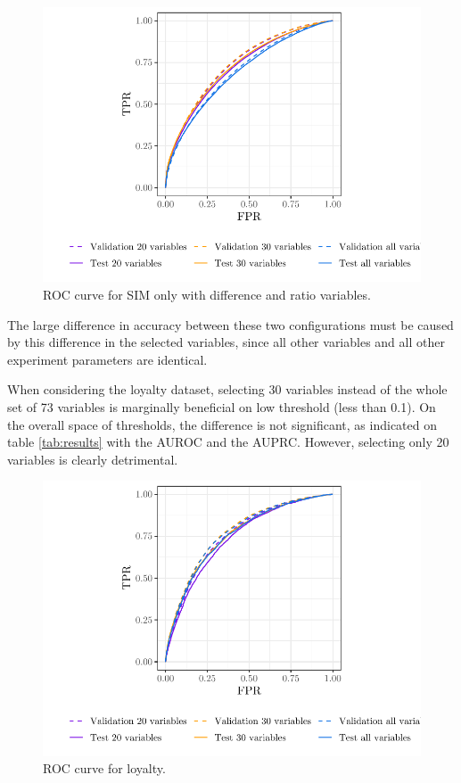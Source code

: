 \begin{figure}
    \centering
    \includegraphics[width=0.9\linewidth]{figures/roc_simo_diff.pdf}
    \caption{ROC curve for SIM only with difference and ratio variables.}
    \label{fig:roc_simo_diff}
\end{figure}

The large difference in accuracy between these two configurations must be caused
by this difference in the selected variables, since all other variables and all
other experiment parameters are identical.

When considering the loyalty dataset, selecting 30 variables instead of the
whole set of 73 variables is marginally beneficial on low threshold (less than
0.1). On the overall space of thresholds, the difference is not significant, as
indicated on table \ref{tab:results} with the AUROC and the AUPRC. However,
selecting only 20 variables is clearly detrimental.

\begin{figure}
    \centering
    \includegraphics[width=0.9\linewidth]{figures/roc_loy.pdf}
    \caption{ROC curve for loyalty.}
    \label{fig:roc_loy}
\end{figure}

